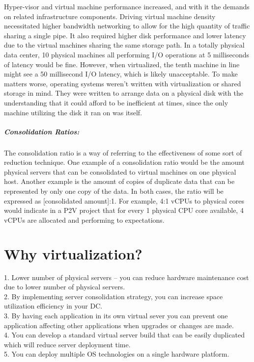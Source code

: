 \documentclass[12pt,a4paper]{report}
\begin{document}
Hyper-visor and virtual machine performance increased, and with it the demands on related infrastructure components. Driving virtual machine density necessitated higher bandwidth networking to allow for the high quantity of traffic sharing a single pipe. It also required higher disk performance and lower latency due to the virtual machines sharing the same storage path. In a totally physical data center, 10 physical machines all performing I/O operations at 5 milliseconds of latency would be fine. However, when virtualized, the tenth machine in line might see a 50 millisecond I/O latency, which is likely unacceptable. To make matters worse, operating systems weren’t written with virtualization or shared storage in mind. They were written to arrange data on a physical disk with the understanding that it could afford to be inefficient at times, since the only machine utilizing the disk it ran on was itself.
\subparagraph{Consolidation Ratios:}
The consolidation ratio is a way of referring to the effectiveness of some sort of reduction technique. One example of a consolidation ratio would be the amount physical servers that can be consolidated to virtual machines on one physical host. Another example is the amount of copies of duplicate data that can be represented by only one copy of the data. In both cases, the ratio will be expressed as [consolidated amount]:1. For example, 4:1 vCPUs to physical cores would indicate in a P2V project that for every 1 physical CPU core available, 4 vCPUs are allocated and performing to expectations.

\newpage
\section{Why virtualization?}

\vspace*{0.1 in}
1.	Lower number of physical servers – you can reduce hardware maintenance cost due to lower number of physical servers. 
\vspace*{0.1 in}\\
2.	By implementing server consolidation strategy, you can increase space utilization efficiency in your DC.
\vspace*{0.1 in}\\
3.	By having each application in its own virtual sever you can prevent one application affecting other applications when upgrades or changes are made. 
\vspace*{0.1 in}\\
4.	You can develop a standard virtual server build that can be easily duplicated which will reduce server deployment time.
\vspace*{0.1 in}\\
5.	You can deploy multiple OS technologies on a single hardware platform.\\
\end{document}
